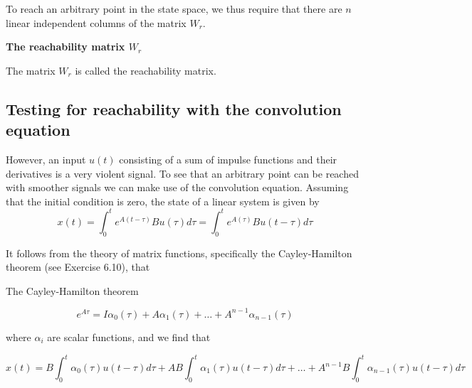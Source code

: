 To reach an arbitrary point  in the state  space,  we  thus  require 
  that there are $n$ linear independent columns of the matrix $W_r$. 


\begin{framed}
\theoremstyle{remark}
\begin{remark}{\textbf{The reachability matrix $W_r$}}

The matrix $W_r$ is called the reachability
matrix.

\end{remark}
\end{framed}

\subsection{Testing for reachability with the convolution equation}

However, an input $u(t)$ consisting of a sum of impulse functions and their derivatives is a very
violent signal. To see that an arbitrary point can be reached with smoother signals we can make use of the convolution equation. Assuming that the initial condition is zero, the state of a linear system is given by
\begin{equation}
x(t)  = \int_{0}^{t} e^{A(t-\tau)}Bu(\tau)d\tau = \int_{0}^{t} e^{A(\tau)}Bu(t-\tau)d\tau
\end{equation}

It follows from the theory of matrix functions, specifically the Cayley-Hamilton
theorem (see Exercise 6.10), that


\begin{framed}
\theoremstyle{remark}
\begin{remark}{The Cayley-Hamilton theorem}

\end{remark}
\end{framed}


\begin{equation}
e^{A\tau}  = I\alpha_0(\tau) + A\alpha_1(\tau) + \dots + A^{n-1}\alpha_{n-1}(\tau)
\end{equation}

where $\alpha_i$ are scalar functions, and we find that 

\begin{equation}
x(t)  = B\int_{0}^{t} \alpha_0(\tau)u(t-\tau)d\tau + AB\int_{0}^{t} \alpha_1(\tau)u(t-\tau)d\tau+ \dots + A^{n-1}B\int_{0}^{t} \alpha_{n-1}(\tau)u(t-\tau)d\tau  
\end{equation}

